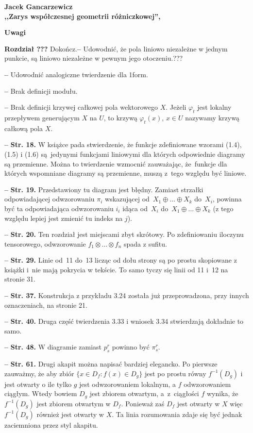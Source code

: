 \documentclass[a4paper,11pt]{article}
\newcommand{\tb}{\textbf}
\newcommand{\noi}{\noindent}
\newcommand{\start}{\noi \tb{--} {}}
\newcommand{\Center}[1]{\begin{center} #1 \end{center}}
\newcommand{\CenterTB}[1]{\Center{\tb{#1}}}
\newcommand{\Str}[1]{\tb{Str. #1.}}
\newcommand{\Dok}{{\color{red} Dokończ.}}
\newcommand{\Work}[1]{ \begin{center} {\large \tb{#1} } \end{center} }
\begin{document}
\Work{
  Jacek Gancarzewicz \\
  ,,Zarys współczesnej geometrii różniczkowej'', \cite{Gan10} }


\CenterTB{Uwagi}

\noi \tb{Rozdział ???} \Dok \start Udowodnić, że pola liniowo
niezależne w jednym punkcie, są liniowo niezależne w pewnym jego
otoczeniu.???

\start Udowodnić analogiczne twierdzenie dla 1\dywiz form.

\start Brak definicji modułu.

\start Brak definicji krzywej całkowej pola wektorowego $X$. Jeżeli
$\varphi_{ t }$ jest lokalny przepływem generującym $X$ na $U$, to
krzywą $\varphi_{ t }( x )$, $x \in U$ nazywamy krzywą całkową pola
$X$.

\start \Str{18} W książce pada stwierdzenie, że funkcje zdefiniowane
wzorami (1.4), (1.5) i (1.6) są~jedynymi funkcjami liniowymi dla
których odpowiednie diagramy są przemienne. Można to twierdzenie
wzmocnić zauważając, że~funkcje dla których wspomniane diagramy są
przemienne, muszą z~tego względu być liniowe.

\start \Str{19} Przedstawiony tu diagram jest błędny. Zamiast strzałki
odpowiadającej odwzorowaniu $\pi_{ i }$ wskazującej
od~$X_{ 1 } \oplus \ldots \oplus X_{ k }$ do~$X_{ i }$, powinna być ta
odpowiadająca odwzorowaniu $i_{ i }$ idąca od~$X_{ i }$
do~$X_{ 1 } \oplus \ldots \oplus X_{ k }$ (z tego względu lepiej jest
zmienić tu indeks na $j$).

\start \Str{20} Ten rozdział jest miejscami zbyt skrótowy. Po
zdefiniowaniu iloczynu tensorowego, odwzorowanie
$f_{ 1 } \otimes \ldots \otimes f_{ n }$ spada z sufitu.

\start \Str{29} Linie od~11 do~13 licząc od dołu strony są po prostu
skopiowane z książki \cite{Gan04} i~nie mają pokrycia w tekście. To
samo tyczy się linii od 11 i~12 na stronie 31.

\start \Str{37} Konstrukcja z przykładu 3.24 została już
przeprowadzona, przy innych oznaczeniach, na stronie 21.

\start \Str{40} Druga część twierdzenia 3.33 i wniosek 3.34
stwierdzają dokładnie to samo.

\start \Str{48} W diagramie zamiast $p^{ r }_{ s }$ powinno być
$\pi^{ r }_{ s }$.

\start \Str{61} Drugi akapit można napisać bardziej elegancko. Po
pierwsze zauważmy, że aby zbiór\linebreak
$\{ x \in D_{ f } : f( x ) \in D_{ g } \}$ jest po prostu równy
$f^{ -1 }( D_{ g } )$ i jest otwarty o ile tylko $g$ jest
odwzorowaniem lokalnym, a $f$ odwzorowaniem ciągłym. Wtedy bowiem
$D_{ g }$ jest zbiorem otwartym, a~z~ciągłości $f$ wynika,
że~$f^{ -1 }( D_{ g } )$ jest zbiorem otwartym w $D_{ f }$. Ponieważ
zaś $D_{ f }$ jest otwarty w $X$ więc $f^{ -1 }( D_{ g } )$ również
jest otwarty w $X$. Ta linia rozumowania zdaje się być jednak
zaciemniona przez styl akapitu.
\end{document}
